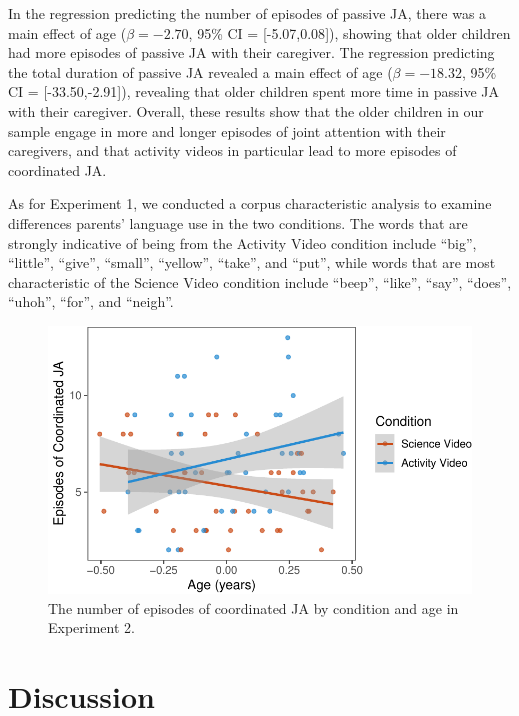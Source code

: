 \documentclass[man,floatsintext]{apa6}
\begin{document}
In the regression predicting the number of episodes of passive JA, there was a main effect of age (\(\beta=-2.70\), 95\% CI = {[}-5.07,0.08{]}), showing that older children had more episodes of passive JA with their caregiver.
The regression predicting the total duration of passive JA revealed a main effect of age (\(\beta=-18.32\), 95\% CI = {[}-33.50,-2.91{]}), revealing that older children spent more time in passive JA with their caregiver.
Overall, these results show that the older children in our sample engage in more and longer episodes of joint attention with their caregivers, and that activity videos in particular lead to more episodes of coordinated JA.

As for Experiment 1, we conducted a corpus characteristic analysis to examine differences parents' language use in the two conditions.
The words that are strongly indicative of being from the Activity Video condition include \enquote{big}, \enquote{little}, \enquote{give}, \enquote{small}, \enquote{yellow}, \enquote{take}, and \enquote{put}, while words that are most characteristic of the Science Video condition include \enquote{beep}, \enquote{like}, \enquote{say}, \enquote{does}, \enquote{uhoh}, \enquote{for}, and \enquote{neigh}.

\begin{figure}[H]

{\centering \includegraphics{figs/e2ja-coord-1} 

}

\caption{The number of episodes of coordinated JA by condition and age in Experiment 2.}\label{fig:e2ja-coord}
\end{figure}

\hypertarget{discussion-1}{%
\section{Discussion}\label{discussion-1}}
\end{document}
